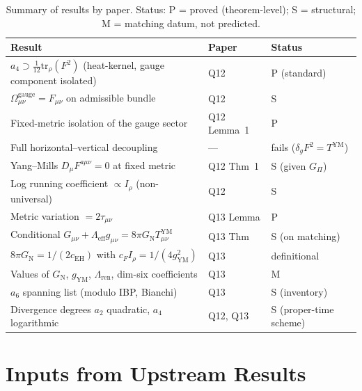 \documentclass[11pt,a4paper]{article}
\theoremstyle{definition}
\newcommand{\GN}{G_{\mathrm{N}}}
\newcommand{\gYM}{g_{\mathrm{YM}}}
\newcommand{\cEH}{c_{\mathrm{EH}}}
\newcommand{\cF}{c_{F}}
\newcommand{\Irho}{I_\rho}
\newcommand{\Gpi}{G_\Pi}
\begin{document}
      \begin{table}[ht]
        \centering
        \caption{Summary of results by paper.
        Status: P = proved (theorem-level); S = structural; M = matching datum, not predicted.}
        \label{tab:results}
        \renewcommand{\arraystretch}{1.2}
        \begin{tabular}{@{}p{7.4cm}ll@{}}
          \toprule
          Result & Paper & Status \\
          \midrule
          $a_4 \supset \frac{1}{12}\mathrm{tr}_\rho(F^2)$ (heat-kernel, gauge component isolated)
          & Q12 & P (standard) \\
          $\Omega^{\mathrm{gauge}}_{\mu\nu} = F_{\mu\nu}$ on admissible bundle & Q12 & S \\
          Fixed-metric isolation of the gauge sector & Q12 Lemma~1 & P \\
          Full horizontal--vertical decoupling & --- & fails ($\delta_g F^2 = T^{\mathrm{YM}}$) \\
          Yang--Mills $D_\mu F^{a\mu\nu} = 0$ at fixed metric & Q12 Thm~1 & S (given $\Gpi$) \\
          Log running coefficient $\propto \Irho$ (non-universal) & Q12 & S \\
          Metric variation $= 2\tau_{\mu\nu}$ & Q13 Lemma & P \\
          Conditional $G_{\mu\nu} + \Lambda_{\mathrm{eff}}g_{\mu\nu}
          = 8\pi\GN T^{\mathrm{YM}}_{\mu\nu}$ & Q13 Thm & S (on matching) \\
          $8\pi\GN = 1/(2\cEH)$ with $\cF\Irho = 1/(4\gYM^2)$ & Q13 & definitional \\
          Values of $\GN$, $\gYM$, $\Lambda_{\mathrm{ren}}$, dim-six coefficients & Q13 & M \\
          $a_6$ spanning list (modulo IBP, Bianchi) & Q13 & S (inventory) \\
          Divergence degrees $a_2$ quadratic, $a_4$ logarithmic & Q12, Q13
          & S (proper-time scheme) \\
          \bottomrule
        \end{tabular}
      \end{table}

  \section{Inputs from Upstream Results}
    \label{sec:inputs}
\end{document}
